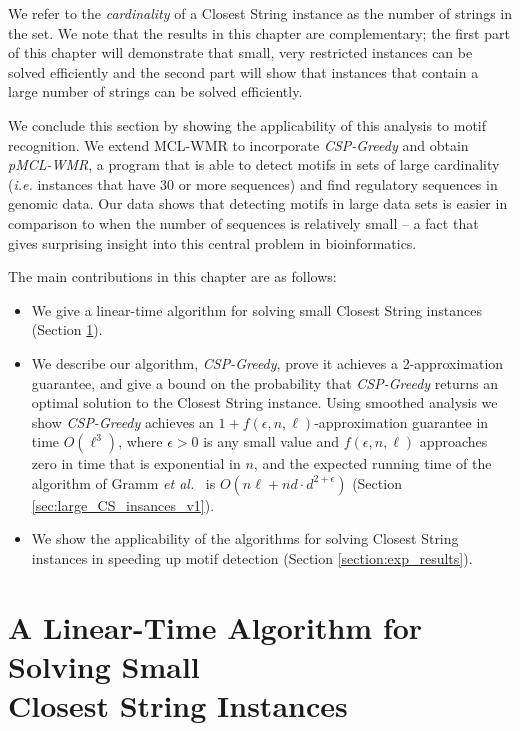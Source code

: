 We refer to the {\em cardinality} of a {\sc Closest String} instance as the number of strings in the set.  We note that the results in this chapter are complementary; the first part of this chapter will demonstrate that small, very restricted instances can be solved efficiently and the second part will show that instances that contain a large number of strings can be solved efficiently.   
 
We conclude this section by showing the applicability of this analysis to motif recognition. We extend MCL-WMR to incorporate {\em CSP-Greedy} and obtain {\em pMCL-WMR}, a program that is able to detect motifs in sets of large cardinality ({\em i.e.} instances that have 30 or more sequences) and find regulatory sequences in genomic data.  Our data shows that detecting motifs in large data sets is easier in comparison to when the number of sequences is relatively small -- a fact that gives surprising insight into this central problem in bioinformatics. 

\newpage
The main contributions in this chapter are as follows:
\begin{itemize} 
\item We give a linear-time algorithm for solving small {\sc Closest String} instances (Section \ref{sec:small_CS_insances}).
\item We describe our algorithm, {\em CSP-Greedy}, prove it achieves a 2-approximation guarantee, and give a bound on the probability that {\em CSP-Greedy} returns an optimal solution to the {\sc Closest String} instance.  Using smoothed analysis we show {\em CSP-Greedy} achieves an $1 + f(\epsilon, n, \ell)$-approximation guarantee in time $O(\ell^3)$, where $\epsilon > 0$ is any small value and $f(\epsilon, n, \ell)$ approaches zero in time that is exponential in $n$, and the expected running time of the algorithm of Gramm {\em et al.}\ \cite{GNR03} is $O(n\ell + nd \cdot d^{2 + \epsilon})$ (Section \ref{sec:large_CS_insances_v1}).
\item We show the applicability of the algorithms for solving {\sc Closest String} instances in speeding up motif detection (Section \ref{section:exp_results}).
\end{itemize}

\section{A Linear-Time Algorithm for Solving Small \\ {\sc Closest String} Instances} \label{sec:small_CS_insances}

